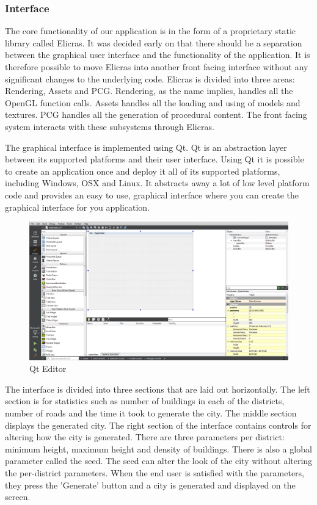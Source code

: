 		\subsubsection{Interface}
		The core functionality of our application is in the form of a proprietary static library called Elicras. It was decided early on that there should be a separation between the graphical user interface and the functionality of the application. It is therefore possible to move Elicras into another front facing interface without any significant changes to the underlying code. Elicras is divided into three areas: Rendering, Assets and PCG. Rendering, as the name implies, handles all the OpenGL function calls. Assets handles all the loading and using of models and textures. PCG handles all the generation of procedural content. The front facing system interacts with these subsystems through Elicras.
		
		\par
		The graphical interface is implemented using Qt\cite{QtWebpage}. Qt is an abstraction layer between its supported platforms and their user interface. Using Qt it is possible to create an application once and deploy it all of its supported platforms, including Windows, OSX and Linux. It abstracts away a lot of low level platform code and provides an easy to use, graphical interface where you can create the graphical interface for you application\cite{Win32Programming}\cite{QtProgramming}.
		
		\begin{figure}[h]
			\centering
			\includegraphics[width=0.7\linewidth]{"Images/Qt"}
			\caption{Qt Editor}
			\label{fig:qt-editor}
		\end{figure}
		
		\par
		The interface is divided into three sections that are laid out horizontally. The left section is for statistics such as number of buildings in each of the districts, number of roads and the time it took to generate the city. The middle section displays the generated city. The right section of the interface contains controls for altering how the city is generated. There are three parameters per district: minimum height, maximum height and density of buildings. There is also a global parameter called the seed. The seed can alter the look of the city without altering the per-district parameters. When the end user is satisfied with the parameters, they press the 'Generate' button and a city is generated and displayed on the screen.
		
